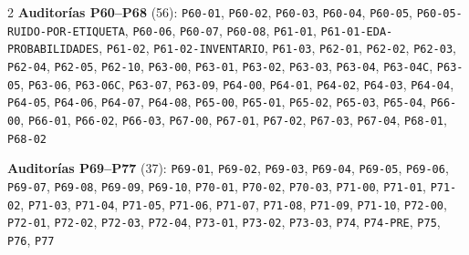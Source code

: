 \begin{multicols}{2}
\noindent\textbf{Auditorías P60--P68} (56): \texttt{P60-\allowbreak{}01}, \texttt{P60-\allowbreak{}02}, \texttt{P60-\allowbreak{}03}, \texttt{P60-\allowbreak{}04}, \texttt{P60-\allowbreak{}05}, \texttt{P60-\allowbreak{}05-\allowbreak{}RUIDO-\allowbreak{}POR-\allowbreak{}ETIQUETA}, \texttt{P60-\allowbreak{}06}, \texttt{P60-\allowbreak{}07}, \texttt{P60-\allowbreak{}08}, \texttt{P61-\allowbreak{}01}, \texttt{P61-\allowbreak{}01-\allowbreak{}EDA-\allowbreak{}PROBABILIDADES}, \texttt{P61-\allowbreak{}02}, \texttt{P61-\allowbreak{}02-\allowbreak{}INVENTARIO}, \texttt{P61-\allowbreak{}03}, \texttt{P62-\allowbreak{}01}, \texttt{P62-\allowbreak{}02}, \texttt{P62-\allowbreak{}03}, \texttt{P62-\allowbreak{}04}, \texttt{P62-\allowbreak{}05}, \texttt{P62-\allowbreak{}10}, \texttt{P63-\allowbreak{}00}, \texttt{P63-\allowbreak{}01}, \texttt{P63-\allowbreak{}02}, \texttt{P63-\allowbreak{}03}, \texttt{P63-\allowbreak{}04}, \texttt{P63-\allowbreak{}04C}, \texttt{P63-\allowbreak{}05}, \texttt{P63-\allowbreak{}06}, \texttt{P63-\allowbreak{}06C}, \texttt{P63-\allowbreak{}07}, \texttt{P63-\allowbreak{}09}, \texttt{P64-\allowbreak{}00}, \texttt{P64-\allowbreak{}01}, \texttt{P64-\allowbreak{}02}, \texttt{P64-\allowbreak{}03}, \texttt{P64-\allowbreak{}04}, \texttt{P64-\allowbreak{}05}, \texttt{P64-\allowbreak{}06}, \texttt{P64-\allowbreak{}07}, \texttt{P64-\allowbreak{}08}, \texttt{P65-\allowbreak{}00}, \texttt{P65-\allowbreak{}01}, \texttt{P65-\allowbreak{}02}, \texttt{P65-\allowbreak{}03}, \texttt{P65-\allowbreak{}04}, \texttt{P66-\allowbreak{}00}, \texttt{P66-\allowbreak{}01}, \texttt{P66-\allowbreak{}02}, \texttt{P66-\allowbreak{}03}, \texttt{P67-\allowbreak{}00}, \texttt{P67-\allowbreak{}01}, \texttt{P67-\allowbreak{}02}, \texttt{P67-\allowbreak{}03}, \texttt{P67-\allowbreak{}04}, \texttt{P68-\allowbreak{}01}, \texttt{P68-\allowbreak{}02}\par\smallskip
\noindent\textbf{Auditorías P69--P77} (37): \texttt{P69-\allowbreak{}01}, \texttt{P69-\allowbreak{}02}, \texttt{P69-\allowbreak{}03}, \texttt{P69-\allowbreak{}04}, \texttt{P69-\allowbreak{}05}, \texttt{P69-\allowbreak{}06}, \texttt{P69-\allowbreak{}07}, \texttt{P69-\allowbreak{}08}, \texttt{P69-\allowbreak{}09}, \texttt{P69-\allowbreak{}10}, \texttt{P70-\allowbreak{}01}, \texttt{P70-\allowbreak{}02}, \texttt{P70-\allowbreak{}03}, \texttt{P71-\allowbreak{}00}, \texttt{P71-\allowbreak{}01}, \texttt{P71-\allowbreak{}02}, \texttt{P71-\allowbreak{}03}, \texttt{P71-\allowbreak{}04}, \texttt{P71-\allowbreak{}05}, \texttt{P71-\allowbreak{}06}, \texttt{P71-\allowbreak{}07}, \texttt{P71-\allowbreak{}08}, \texttt{P71-\allowbreak{}09}, \texttt{P71-\allowbreak{}10}, \texttt{P72-\allowbreak{}00}, \texttt{P72-\allowbreak{}01}, \texttt{P72-\allowbreak{}02}, \texttt{P72-\allowbreak{}03}, \texttt{P72-\allowbreak{}04}, \texttt{P73-\allowbreak{}01}, \texttt{P73-\allowbreak{}02}, \texttt{P73-\allowbreak{}03}, \texttt{P74}, \texttt{P74-\allowbreak{}PRE}, \texttt{P75}, \texttt{P76}, \texttt{P77}\par\smallskip

\end{multicols}
